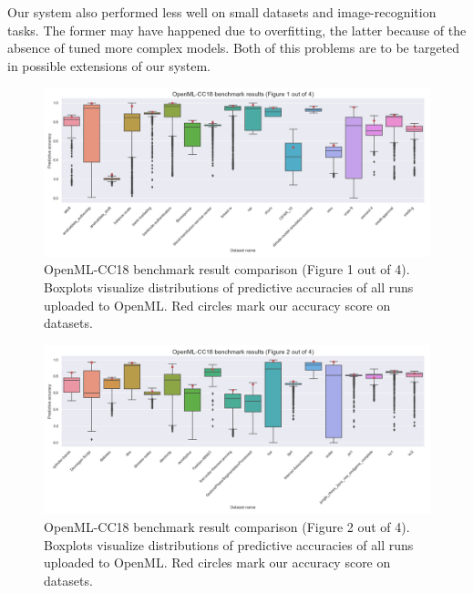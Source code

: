 Our system also performed less well on small datasets and image-recognition
tasks. The former may have happened due to overfitting, the latter because of
the absence of tuned more complex models. Both of this problems are to be
targeted in possible extensions of our system.


\begin{figure}
    \includegraphics[width=\textwidth]{../img/openml-boxplot0.png}
    \caption[OpenML-CC18 benchmark result comparison (Figure 1 out of 4)]{
    OpenML-CC18 benchmark result comparison (Figure 1 out of 4).
    Boxplots visualize distributions of predictive accuracies of all
    runs uploaded to OpenML. Red circles mark our accuracy score on datasets.}
    \label{fig:OpenML:boxplot:0}
\end{figure}

\begin{figure}
    \includegraphics[width=\textwidth]{../img/openml-boxplot1.png}
    \caption[OpenML-CC18 benchmark result comparison (Figure 2 out of 4)]{
	OpenML-CC18 benchmark result comparison (Figure 2 out of 4).    
    Boxplots visualize distributions of predictive accuracies of all
    runs uploaded to OpenML. Red circles mark our accuracy score on datasets.}
    \label{fig:OpenML:boxplot:1}
\end{figure}

